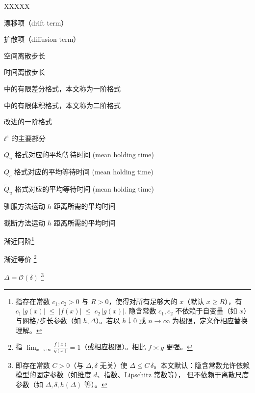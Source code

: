 	\begin{newdescription}{XXXXX}  %
		
		\item[\( \mu(X_t) \)]    漂移项（drift term） 
		\item[$\sigma(X_t)$] 扩散项（diffusion term）
		\item[$\delta x,h $] 空间离散步长
		\item[$\Delta$] 时间离散步长
		\item[$Q_u$] \cite{bou2018continuous}中的有限差分格式，本文称为一阶格式
		\item[$Q_c$] \cite{bou2018continuous}中的有限体积格式，本文称为二阶格式
		\item[$\widetilde{Q}_u$] 改进的一阶格式
		\item[$t^*$] $t^e$ 的主要部分
		\item[$t^u$] $Q_u$ 格式对应的平均等待时间 (mean holding time)
		\item[$t^c$] $Q_c$ 格式对应的平均等待时间 (mean holding time)
		\item[$\tilde{t}^u$] $\widetilde{Q}_u$ 格式对应的平均等待时间 (mean holding time)
		\item[$t^{\delta}$] 驯服方法运动 $h$ 距离所需的平均时间
		\item[$t^{\Delta}$] 截断方法运动 $h$ 距离所需的平均时间
		\item[$f(x)\asymp g(x)$]
		渐近同阶\footnote{指存在常数 $c_1,c_2>0$ 与 $R>0$，使得对所有足够大的 $x$（默认 $x\ge R$），有
		\(		c_1\,|g(x)| \;\le\; |f(x)| \;\le\; c_2\,|g(x)|.
		\)
		隐含常数 $c_1,c_2$ 不依赖于自变量（如 $x$）与网格/步长参数（如 $h,\Delta$）。若以 $h\downarrow 0$ 或 $n\to\infty$ 为极限，定义作相应替换理解。}
		
		\item[$f(x)\sim g(x)$]
		渐近等价 \footnote{指 $\displaystyle \lim_{x\to\infty}\frac{f(x)}{g(x)}=1$（或相应极限）。相比 $f\asymp g$ 更强。}
		
		\item[\(\Delta \lesssim \delta\)]
		\(\Delta = \mathcal O(\delta)\)
		\footnote{即存在常数 \(C>0\)（与 \(\Delta,\delta\) 无关）使
		\(\Delta \le C\,\delta\)。本文默认：隐含常数允许依赖模型的固定参数（如维度 \(d\)、指数、Lipschitz 常数等），
		但不依赖于离散尺度参数（如 \(\Delta,\delta,h(\Delta)\) 等）。}
		
		
	\end{newdescription}
	
